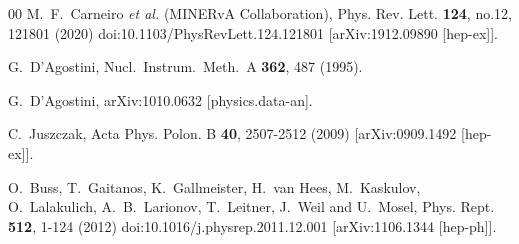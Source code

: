 \documentclass[aps,prl,twocolumn,superscriptaddress,nofootinbib]{revtex4}
\begin{document}
\begin{thebibliography}{00}
M.~F.~Carneiro \textit{et al.} (MINERvA Collaboration),
Phys. Rev. Lett. \textbf{124}, no.12, 121801 (2020)
doi:10.1103/PhysRevLett.124.121801
[arXiv:1912.09890 [hep-ex]].



  G.~D'Agostini,
  Nucl.\ Instrum.\ Meth.\ A {\bf 362}, 487 (1995).
   
  G.~D'Agostini,
  arXiv:1010.0632 [physics.data-an].
   


C.~Juszczak,
Acta Phys. Polon. B \textbf{40}, 2507-2512 (2009)
[arXiv:0909.1492 [hep-ex]].

O.~Buss, T.~Gaitanos, K.~Gallmeister, H.~van Hees, M.~Kaskulov, O.~Lalakulich, A.~B.~Larionov, T.~Leitner, J.~Weil and U.~Mosel,
Phys. Rept. \textbf{512}, 1-124 (2012)
doi:10.1016/j.physrep.2011.12.001
[arXiv:1106.1344 [hep-ph]].
\end{thebibliography}


\clearpage
\onecolumngrid
\pagebreak
\end{document}
